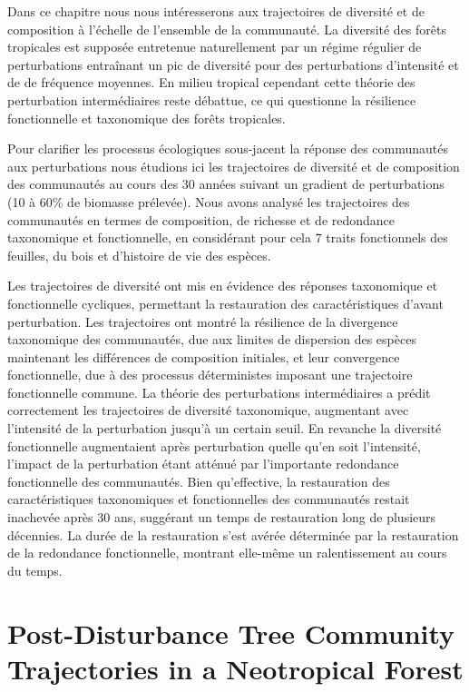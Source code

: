 \documentclass[
  11pt,
  french,
  A4paper,
  extrafontsizes,onecolumn,openright
  ]{memoir}
\begin{document}
Dans ce chapitre nous nous intéresserons aux trajectoires de diversité
et de composition à l'échelle de l'ensemble de la communauté. La
diversité des forêts tropicales est supposée entretenue naturellement
par un régime régulier de perturbations entraînant un pic de diversité
pour des perturbations d'intensité et de de fréquence moyennes. En
milieu tropical cependant cette théorie des perturbation intermédiaires
reste débattue, ce qui questionne la résilience fonctionnelle et
taxonomique des forêts tropicales.

Pour clarifier les processus écologiques sous-jacent la réponse des
communautés aux perturbations nous étudions ici les trajectoires de
diversité et de composition des communautés au cours des 30 années
suivant un gradient de perturbations (10 à 60\% de biomasse prélevée).
Nous avons analysé les trajectoires des communautés en termes de
composition, de richesse et de redondance taxonomique et fonctionnelle,
en considérant pour cela 7 traits fonctionnels des feuilles, du bois et
d'histoire de vie des espèces.

Les trajectoires de diversité ont mis en évidence des réponses
taxonomique et fonctionnelle cycliques, permettant la restauration des
caractéristiques d'avant perturbation. Les trajectoires ont montré la
résilience de la divergence taxonomique des communautés, due aux limites
de dispersion des espèces maintenant les différences de composition
initiales, et leur convergence fonctionnelle, due à des processus
déterministes imposant une trajectoire fonctionnelle commune. La théorie
des perturbations intermédiaires a prédit correctement les trajectoires
de diversité taxonomique, augmentant avec l'intensité de la perturbation
jusqu'à un certain seuil. En revanche la diversité fonctionnelle
augmentaient après perturbation quelle qu'en soit l'intensité, l'impact
de la perturbation étant atténué par l'importante redondance
fonctionnelle des communautés. Bien qu'effective, la restauration des
caractéristiques taxonomiques et fonctionnelles des communautés restait
inachevée après 30 ans, suggérant un temps de restauration long de
plusieurs décennies. La durée de la restauration s'est avérée déterminée
par la restauration de la redondance fonctionnelle, montrant elle-même
un ralentissement au cours du temps.

\newpage

\section*{Post-Disturbance Tree Community Trajectories in a Neotropical
Forest}\label{post-disturbance-tree-community-trajectories-in-a-neotropical-forest}
\end{document}
